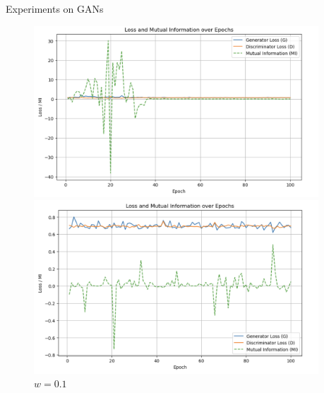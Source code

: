 \documentclass[final]{beamer}
\newlength{\sepwidth}
\newlength{\colwidth}
\newcommand{\separatorcolumn}{\begin{column}{\sepwidth}\end{column}}
\begin{document}
\begin{frame}[t]
\begin{columns}[t]
\begin{column}{\colwidth}
\begin{block}{Experiments on GANs}
    \begin{figure}
    \centering
    \begin{minipage}{0.49\textwidth}
        \centering
        \includegraphics[width=1\linewidth]{截屏2025-01-01 00.47.33.png}
        \caption{$w=0$}
    \end{minipage}
    \begin{minipage}{0.49\textwidth}
        \centering
        \includegraphics[width=1\linewidth]{截屏2025-01-01 00.47.09.png}
        \caption{$w=0.1$}
    \end{minipage}
    \end{figure}

    
        
  \end{block}

\end{column}

\separatorcolumn
\end{columns}
\end{frame}
\end{document}
